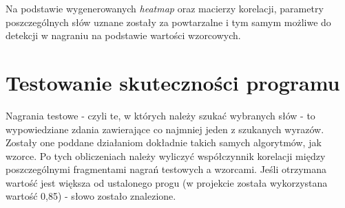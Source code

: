 Na podstawie wygenerowanych \textit{heatmap} oraz macierzy korelacji, parametry poszczególnych słów uznane zostały za powtarzalne i tym samym możliwe do detekcji w nagraniu na podstawie wartości wzorcowych.

\newpage
 
\section{Testowanie skuteczności programu}

Nagrania testowe - czyli te, w których należy szukać wybranych słów - to wypowiedziane zdania zawierające co najmniej jeden z szukanych wyrazów. Zostały one poddane działaniom dokładnie takich samych algorytmów, jak wzorce. Po tych obliczeniach należy wyliczyć współczynnik korelacji między poszczególnymi fragmentami nagrań testowych a wzorcami. Jeśli otrzymana wartość jest większa od ustalonego progu (w projekcie została wykorzystana wartość 0,85) - słowo zostało znalezione. 